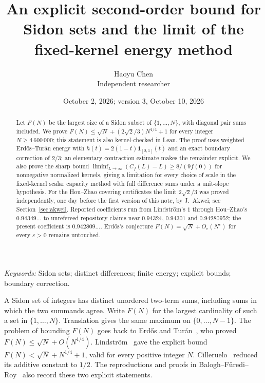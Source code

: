 \documentclass[10pt]{article}
\title{An explicit second-order bound for Sidon sets and the limit of the fixed-kernel energy method}
\author{Haoyu Chen\\ Independent researcher}
\date{October 2, 2026; version 3, October 10, 2026}
\makeatletter
\numberwithin{equation}{section}
\theoremstyle{remark}
\renewcommand\section{\@startsection{section}{1}{\z@}{-2.6ex \@plus -.8ex \@minus -.2ex}{1.3ex \@plus .2ex}{\normalfont\large\bfseries}}
\makeatother
\begin{document}
\maketitle

\begin{abstract}
Let $F(N)$ be the largest size of a Sidon subset of $\{1,\ldots,N\}$,
with diagonal pair sums included. We prove
$F(N)\le\sqrt N+(2\sqrt2/3)N^{1/4}+1$ for every integer $N\ge4\,600\,000$;
this statement is also kernel-checked in Lean.
The proof uses weighted Erd\H{o}s--Tur\'an energy with
$h(t)=2(1-t)\mathbf1_{[0,1]}(t)$ and an exact boundary correction of $2/3$;
an elementary contraction estimate makes the remainder explicit.
We also prove the sharp bound
$\liminf_{L\to\infty}(C_f(L)-L)\ge8/(9f(0))$ for nonnegative normalized
kernels, giving a limitation for every choice of scale in the
fixed-kernel scalar capacity method with full difference sums under a
unit-slope hypothesis. For the Hou--Zhao covering certificates the
limit $2\sqrt2/3$ was proved independently, one day before the first
version of this note, by J.~Akwei; see Section~\ref{sec:akwei}.
Reported coefficients run from Lindstr\"om's $1$ through Hou--Zhao's
$0.94349\ldots$ to unrefereed repository claims near $0.94324$,
$0.94301$ and $0.94280952$; the present coefficient is $0.942809\ldots$.
Erd\H{o}s's conjecture $F(N)=\sqrt N+O_\varepsilon(N^\varepsilon)$
for every $\varepsilon>0$ remains untouched.
\end{abstract}

\noindent\textit{Keywords:} Sidon sets; distinct differences; finite energy;
explicit bounds; boundary correction.

\section{Introduction}\label{sec:introduction}

A Sidon set of integers has distinct unordered two-term sums, including
sums in which the two summands agree. Write $F(N)$ for the largest
cardinality of such a set in $\{1,\ldots,N\}$. Translation gives the same
maximum on $\{0,\ldots,N-1\}$. The problem of bounding $F(N)$ goes back
to Erd\H{o}s and Tur\'an~\cite{ET41}, who proved
$F(N)\le\sqrt N+O(N^{1/4})$. Lindstr\"om~\cite{Lind69} gave the explicit
bound $F(N)<\sqrt N+N^{1/4}+1$, valid for every positive integer $N$.
Cilleruelo~\cite{Cil10} reduced its additive constant to $1/2$.
The reproductions and proofs in Balogh--F\"uredi--Roy~\cite{BFR23}
also record these two explicit statements.
\end{document}
